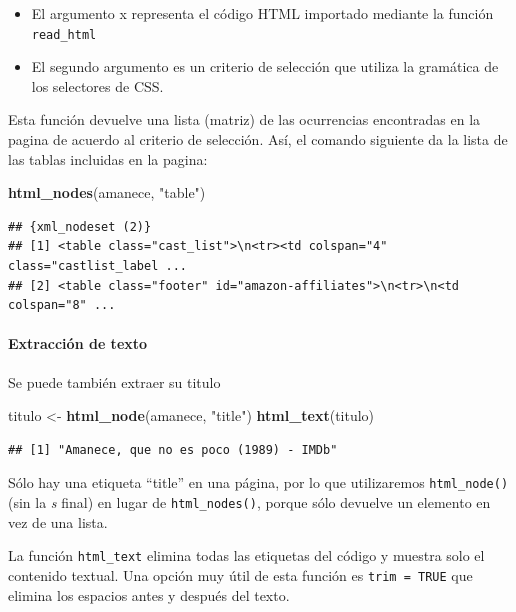 \documentclass[]{article}
\newenvironment{Shaded}{\begin{snugshade}}{\end{snugshade}}
\newcommand{\KeywordTok}[1]{\textcolor[rgb]{0.13,0.29,0.53}{\textbf{#1}}}
\newcommand{\StringTok}[1]{\textcolor[rgb]{0.31,0.60,0.02}{#1}}
\newcommand{\NormalTok}[1]{#1}
\providecommand{\tightlist}{%
  \setlength{\itemsep}{0pt}\setlength{\parskip}{0pt}}
\let\oldparagraph\paragraph
\renewcommand{\paragraph}[1]{\oldparagraph{#1}\mbox{}}
\begin{document}
\begin{itemize}
\tightlist
\item
  El argumento x representa el código HTML importado mediante la función
  \texttt{read\_html}
\item
  El segundo argumento es un criterio de selección que utiliza la
  gramática de los selectores de CSS.
\end{itemize}

Esta función devuelve una lista (matriz) de las ocurrencias encontradas
en la pagina de acuerdo al criterio de selección. Así, el comando
siguiente da la lista de las tablas incluidas en la pagina:

\begin{Shaded}
\begin{Highlighting}[]
\KeywordTok{html_nodes}\NormalTok{(amanece, }\StringTok{"table"}\NormalTok{) }
\end{Highlighting}
\end{Shaded}

\begin{verbatim}
## {xml_nodeset (2)}
## [1] <table class="cast_list">\n<tr><td colspan="4" class="castlist_label ...
## [2] <table class="footer" id="amazon-affiliates">\n<tr>\n<td colspan="8" ...
\end{verbatim}

\paragraph{Extracción de texto}\label{extraccion-de-texto}

Se puede también extraer su titulo

\begin{Shaded}
\begin{Highlighting}[]
\NormalTok{titulo <-}\StringTok{ }\KeywordTok{html_node}\NormalTok{(amanece, }\StringTok{"title"}\NormalTok{)}
\KeywordTok{html_text}\NormalTok{(titulo)}
\end{Highlighting}
\end{Shaded}

\begin{verbatim}
## [1] "Amanece, que no es poco (1989) - IMDb"
\end{verbatim}

Sólo hay una etiqueta ``title'' en una página, por lo que utilizaremos
\texttt{html\_node()} (sin la \emph{s} final) en lugar de
\texttt{html\_nodes()}, porque sólo devuelve un elemento en vez de una
lista.

La función \texttt{html\_text} elimina todas las etiquetas del código y
muestra solo el contenido textual. Una opción muy útil de esta función
es \texttt{trim\ =\ TRUE} que elimina los espacios antes y después del
texto.
\end{document}
